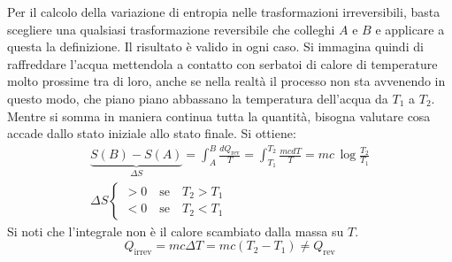 \documentclass[10pt,a4paper]{book}
\begin{document}
\FloatBarrier
Per il calcolo della variazione di entropia nelle trasformazioni irreversibili, basta scegliere una qualsiasi trasformazione reversibile che colleghi $A$ e $B$ e applicare a questa la definizione. Il risultato è valido in ogni caso. Si immagina quindi di raffreddare l'acqua mettendola a contatto con serbatoi di calore di temperature molto prossime tra di loro, anche se nella realtà il processo non sta avvenendo in questo modo, che piano piano abbassano la temperatura dell'acqua da $T_1$ a $T_2$.
Mentre si somma in maniera continua tutta la quantità, bisogna valutare cosa accade dallo stato iniziale allo stato finale. Si ottiene:
\begin{gather*}
	\underbrace{S(B) - S(A)}_{\Delta S} = \int_A^B \frac{dQ_{\text{rev} } }{T} = \int_{T_1 }^{T_2 } \frac{mcdT}{T} = mc\,\log \frac{T_2 }{T_1 } \\
	\Delta S \left\{ \begin{array}{r}
		>0 \quad \text{se} \quad T_2>T_1 \\
		<0 \quad \text{se} \quad T_2<T_1
	\end{array} \right.
\end{gather*}
Si noti che l'integrale non è il calore scambiato dalla massa su $T$.
\[
	Q_{\text{irrev}} = mc\Delta T = mc(T_2-T_1) \neq Q_{\text{rev}}
\]
\end{document}
